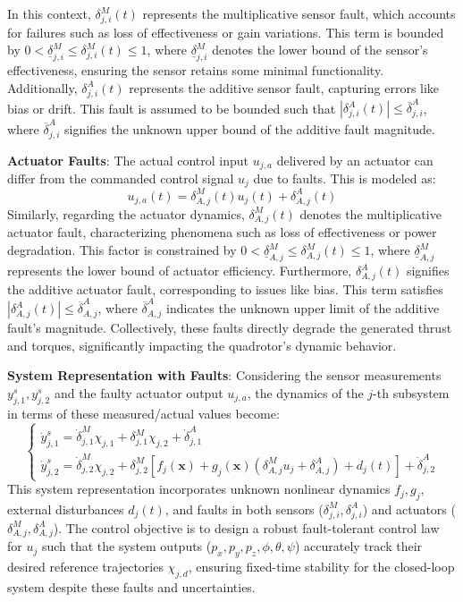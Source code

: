 In this context, $\delta_{j,i}^M(t)$ represents the multiplicative sensor fault, which accounts for failures such as loss of effectiveness or gain variations. This term is bounded by $0 < \underline{\delta}_{j,i}^M \le \delta_{j,i}^M(t) \le 1$, where $\underline{\delta}_{j,i}^M$ denotes the lower bound of the sensor's effectiveness, ensuring the sensor retains some minimal functionality. Additionally, $\delta_{j,i}^A(t)$ represents the additive sensor fault, capturing errors like bias or drift. This fault is assumed to be bounded such that $|\delta_{j,i}^A(t)| \le \overline{\delta}_{j,i}^A$, where $\overline{\delta}_{j,i}^A$ signifies the unknown upper bound of the additive fault magnitude.

\textbf{Actuator Faults}:
The actual control input $u_{j,a}$ delivered by an actuator can differ from the commanded control signal $u_j$ due to faults. This is modeled as:
\begin{equation}
\label{eq:actuator_fault_model_quad}
u_{j,a}(t) = \delta_{A,j}^M(t) u_j(t) + \delta_{A,j}^A(t)
\end{equation}
Similarly, regarding the actuator dynamics, $\delta_{A,j}^M(t)$ denotes the multiplicative actuator fault, characterizing phenomena such as loss of effectiveness or power degradation. This factor is constrained by $0 < \underline{\delta}_{A,j}^M \le \delta_{A,j}^M(t) \le 1$, where $\underline{\delta}_{A,j}^M$ represents the lower bound of actuator efficiency. Furthermore, $\delta_{A,j}^A(t)$ signifies the additive actuator fault, corresponding to issues like bias. This term satisfies $|\delta_{A,j}^A(t)| \le \overline{\delta}_{A,j}^A$, where $\overline{\delta}_{A,j}^A$ indicates the unknown upper limit of the additive fault's magnitude. Collectively, these faults directly degrade the generated thrust and torques, significantly impacting the quadrotor's dynamic behavior.

\textbf{System Representation with Faults}:
Considering the sensor measurements $y_{j,1}^s, y_{j,2}^s$ and the faulty actuator output $u_{j,a}$, the dynamics of the $j$-th subsystem in terms of these measured/actual values become:
\begin{equation}
\label{eq:faulty_subsystem_dyn_quad}
\begin{cases}
\dot{y}_{j,1}^s = \dot{\delta}_{j,1}^M \chi_{j,1} + \delta_{j,1}^M \chi_{j,2} + \dot{\delta}_{j,1}^A \\
\dot{y}_{j,2}^s = \dot{\delta}_{j,2}^M \chi_{j,2} + \delta_{j,2}^M [f_j(\mathbf{x}) + g_j(\mathbf{x})(\delta_{A,j}^M u_j + \delta_{A,j}^A) + d_j(t)] + \dot{\delta}_{j,2}^A
\end{cases}
\end{equation}
This system representation incorporates unknown nonlinear dynamics $f_j, g_j$, external disturbances $d_j(t)$, and faults in both sensors ($\delta_{j,i}^M, \delta_{j,i}^A$) and actuators ($\delta_{A,j}^M, \delta_{A,j}^A$). The control objective is to design a robust fault-tolerant control law for $u_j$ such that the system outputs ($p_x, p_y, p_z, \phi, \theta, \psi$) accurately track their desired reference trajectories $\chi_{j,d}$, ensuring fixed-time stability for the closed-loop system despite these faults and uncertainties.

